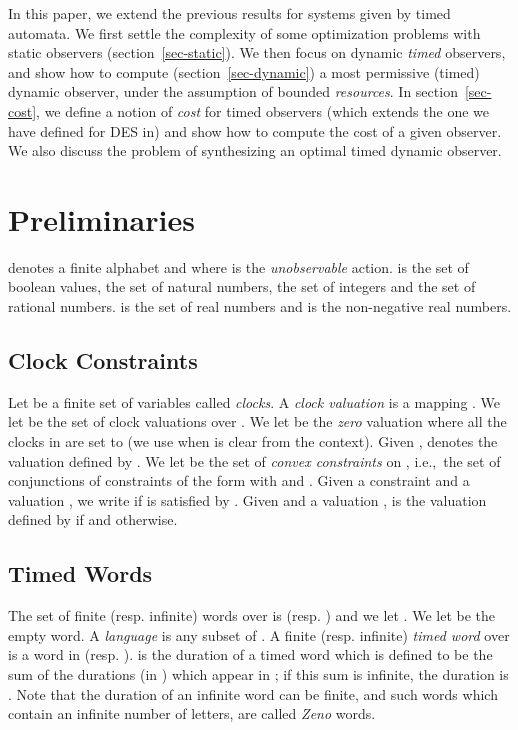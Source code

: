 \documentclass[letterpaper,10pt,conference]{ieeeconf}  \IEEEoverridecommandlockouts                              \overrideIEEEmargins
\def\ie{{i.e.},~}
\begin{document}
In this paper, we extend the previous results for systems given by
timed automata. We first settle the complexity of some optimization
problems with static observers (section~\ref{sec-static}).  We then
focus on dynamic \emph{timed} observers, and show how to compute
(section~\ref{sec-dynamic}) a most permissive (timed) dynamic
observer, under the assumption of bounded \emph{resources}. In
section~\ref{sec-cost}, we define a notion of \emph{cost} for timed
observers (which extends the one we have defined for DES
in\cite{cassez-tase-07}) and show how to compute the cost of a given
observer.  We also discuss the problem of synthesizing an optimal
timed dynamic observer.




\section{Preliminaries}\label{sec-prelim}
 denotes a finite alphabet and  where  is the \emph{unobservable}
action.   is the set of boolean values,
 the set of natural numbers,  the set of integers and
 the set of rational numbers.   is the set of real
numbers and  is the non-negative real numbers.

\subsection{Clock Constraints}
Let  be a finite set of variables called \emph{clocks}.  A
\emph{clock valuation} is a mapping . We let  be the set of clock valuations over
. We let  be the \emph{zero} valuation where all the
clocks in  are set to  (we use  when  is clear from
the context).  Given ,  denotes the
valuation defined by . We let 
be the set of \emph{convex constraints} on , \ie the set of
conjunctions of constraints of the form  with  and . Given a constraint  and a valuation , we write  if  is
satisfied by .  Given  and a valuation , 
is the valuation defined by  if  and
 otherwise.

\subsection{Timed Words}
The set of finite (resp. infinite) words over  is 
(resp. ) and we let . We let  be the empty word. A \emph{language}
 is any subset of . A finite (resp. infinite)
\emph{timed word} over  is a word in  (resp. ).   is the duration of a timed word 
which is defined to be the sum of the durations (in )
which appear in ; if this sum is infinite, the duration is
.  Note that the duration of an infinite word can be finite,
and such words which contain an infinite number of letters, are called
\emph{Zeno} words.
\end{document}
